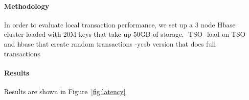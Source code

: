 \paragraph{Methodology}
In order to evaluate local transaction performance, we set up a 3 node Hbase cluster loaded with 20M keys that take up 50GB of storage.
-TSO
-load on TSO and hbase that create random transactions
-ycsb version that does full transactions

\paragraph{Results}
Results are shown in Figure~\ref{fig:latency}

